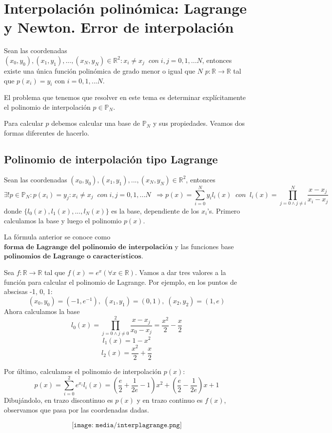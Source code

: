 \section{Interpolación polinómica: Lagrange y Newton. Error de interpolación}
Sean las coordenadas $(x_0,y_0), (x_1,y_1),...,(x_N,y_N) \in \mathbb{R}^2 : x_i \neq x_j \; \; con \; i,j = 0,1,...N$, entonces existe una única función polinómica de grado menor o igual que $N$ $p : \mathbb{R} \longrightarrow \mathbb{R}$ tal que $p(x_i) = y_i$ con $i = 0,1,...N$.

El problema que tenemos que resolver en este tema es determinar explícitamente el polinomio de interpolación $p \in \mathbb{P} _N$.

Para calcular $p$ debemos calcular una base de $\mathbb{P} _N$ y sus propiedades. Veamos dos formas diferentes de hacerlo.

\subsection{Polinomio de interpolación tipo Lagrange}
\begin{nth}
Sean las coordenadas $(x_0,y_0), (x_1,y_1),...,(x_N,y_N) \in \mathbb{R}^2$, entonces
\[ \exists ! p \in \mathbb{P} _N : p(x_i) = y_j : x_i \neq x_j \; \; con \; i,j = 0,1,...N \; \; \Rightarrow p(x) = \sum_{i=0}^N y_il_i(x) \; \; con \; \; l_i(x) = \prod_{j=0 \wedge j \neq i}^N \frac{x-x_j}{x_i-x_j} \]
donde $\lbrace l_0(x), l_1(x),...,l_N(x) \rbrace$ es la base, dependiente de los $x_i$'s. Primero calculamos la base y luego el polinomio $p(x)$.
\end{nth}

La fórmula anterior se conoce como $\textbf{forma de Lagrange del polinomio de
interpolación}$ y las funciones base $\textbf{polinomios de Lagrange o característicos}$.

\begin{ejemplo}
Sea $f: \mathbb{R} \longrightarrow \mathbb{R}$ tal que $f(x) = e^x ( \forall x \in \mathbb{R} )$. Vamos a dar tres valores a la función para calcular el polinomio de Lagrange. Por ejemplo, en los puntos de abscisas -1, 0, 1:
\[ (x_0, y_0) = (-1,e^{-1}), \; (x_1,y_1) = (0,1), \; (x_2,y_2) = (1,e) \]
Ahora calculamos la base
\[ l_0(x) = \prod_{j=0 \wedge j \neq 0}^2 \frac{x-x_j}{x_0-x_j} = \frac{x^2}{2} - \frac{x}{2} \]
\[ l_1(x) = 1 - x^2 \]
\[ l_2(x) = \frac{x^2}{2} + \frac{x}{2} \]

Por último, calculamos el polinomio  de interpolación $p(x)$:
\[ p(x) = \sum _{i=0}^2 e^{x_i}l_i(x) = \left( \frac{e}{2} + \frac{1}{2e} - 1 \right) x^2 + \left( \frac{e}{2} - \frac{1}{2e} \right) x + 1 \]
Dibujándolo, en trazo discontinuo es $p(x)$ y en trazo continuo es $f(x)$, observamos que pasa por las coordenadas dadas.

\[ \texttt{[image: media/interplagrange.png]} \]
\end{ejemplo}

